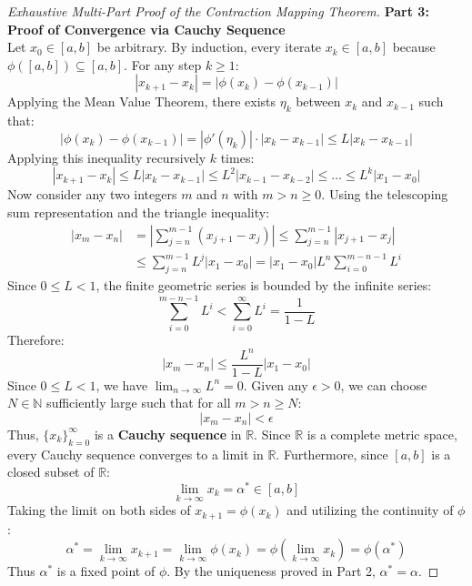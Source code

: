 \begin{proof}[Exhaustive Multi-Part Proof of the Contraction Mapping Theorem]
\medskip
\noindent\textbf{Part 3: Proof of Convergence via Cauchy Sequence} \\
Let $x_0 \in [a, b]$ be arbitrary. By induction, every iterate $x_k \in [a, b]$ because $\phi([a, b]) \subseteq [a, b]$.
For any step $k \ge 1$:
\begin{equation}
    |x_{k+1} - x_k| = |\phi(x_k) - \phi(x_{k-1})|
\end{equation}
Applying the Mean Value Theorem, there exists $\eta_k$ between $x_k$ and $x_{k-1}$ such that:
\begin{equation}
    |\phi(x_k) - \phi(x_{k-1})| = |\phi'(\eta_k)| \cdot |x_k - x_{k-1}| \le L |x_k - x_{k-1}|
\end{equation}
Applying this inequality recursively $k$ times:
\begin{equation}
    |x_{k+1} - x_k| \le L |x_k - x_{k-1}| \le L^2 |x_{k-1} - x_{k-2}| \le \dots \le L^k |x_1 - x_0|
\end{equation}
Now consider any two integers $m$ and $n$ with $m > n \ge 0$. Using the telescoping sum representation and the triangle inequality:
\begin{align}
    |x_m - x_n| &= \left| \sum_{j=n}^{m-1} (x_{j+1} - x_j) \right| \le \sum_{j=n}^{m-1} |x_{j+1} - x_j| \nonumber \\
    &\le \sum_{j=n}^{m-1} L^j |x_1 - x_0| = |x_1 - x_0| L^n \sum_{i=0}^{m-n-1} L^i
\end{align}
Since $0 \le L < 1$, the finite geometric series is bounded by the infinite series:
\begin{equation}
    \sum_{i=0}^{m-n-1} L^i < \sum_{i=0}^\infty L^i = \frac{1}{1 - L}
\end{equation}
Therefore:
\begin{equation}
    \label{eq:cauchy_bound}
    |x_m - x_n| \le \frac{L^n}{1 - L} |x_1 - x_0|
\end{equation}
Since $0 \le L < 1$, we have $\lim_{n \to \infty} L^n = 0$. Given any $\epsilon > 0$, we can choose $N \in \mathbb{N}$ sufficiently large such that for all $m > n \ge N$:
\begin{equation}
    |x_m - x_n| < \epsilon
\end{equation}
Thus, $\{x_k\}_{k=0}^\infty$ is a \textbf{Cauchy sequence} in $\mathbb{R}$. Since $\mathbb{R}$ is a complete metric space, every Cauchy sequence converges to a limit in $\mathbb{R}$. Furthermore, since $[a, b]$ is a closed subset of $\mathbb{R}$:
\begin{equation}
    \lim_{k \to \infty} x_k = \alpha^* \in [a, b]
\end{equation}
Taking the limit on both sides of $x_{k+1} = \phi(x_k)$ and utilizing the continuity of $\phi$:
\begin{equation}
    \alpha^* = \lim_{k \to \infty} x_{k+1} = \lim_{k \to \infty} \phi(x_k) = \phi\left( \lim_{k \to \infty} x_k \right) = \phi(\alpha^*)
\end{equation}
Thus $\alpha^*$ is a fixed point of $\phi$. By the uniqueness proved in Part 2, $\alpha^* = \alpha$.


\end{proof}

